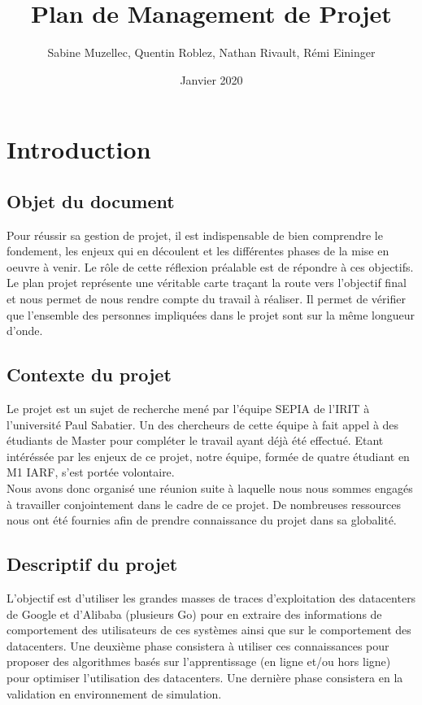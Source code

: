 \documentclass{article}
\title{Plan de Management de Projet}
\author{Sabine Muzellec, Quentin Roblez, Nathan Rivault, Rémi Eininger}
\date{Janvier 2020}
\begin{document}
\maketitle

\section{Introduction}
\subsection{Objet du document}
Pour réussir sa gestion de projet, il est indispensable de bien comprendre le fondement, les enjeux qui en découlent et les différentes phases de la mise en oeuvre à venir.
Le rôle de cette réflexion préalable est de répondre à ces objectifs.\\
Le plan projet représente une véritable carte traçant la route vers l'objectif final et nous permet de nous rendre compte du travail à réaliser.
Il permet de vérifier que l'ensemble des personnes impliquées dans le projet sont sur la même longueur d'onde.

\subsection{Contexte du projet}
Le projet est un sujet de recherche mené par l'équipe SEPIA de l'IRIT à l'université Paul Sabatier. Un des chercheurs de cette équipe à fait appel à des étudiants de Master pour compléter le travail ayant déjà été effectué. Etant intéréssée par les enjeux de ce projet, notre équipe, formée de quatre étudiant en M1 IARF, s'est portée volontaire. \\
Nous avons donc organisé une réunion suite à laquelle nous nous sommes engagés à travailler conjointement dans le cadre de ce projet. De nombreuses ressources nous ont été fournies afin de prendre connaissance du projet dans sa globalité.

\subsection{Descriptif du projet}
L'objectif est d'utiliser les grandes masses de traces d'exploitation des datacenters de Google et d'Alibaba (plusieurs Go) pour en extraire des informations de comportement des utilisateurs de ces systèmes ainsi que sur le comportement des datacenters. Une deuxième phase consistera à utiliser ces connaissances pour proposer des algorithmes basés sur l'apprentissage (en ligne et/ou hors ligne) pour optimiser l'utilisation des datacenters. Une dernière phase consistera en la validation en environnement de simulation.
\end{document}
